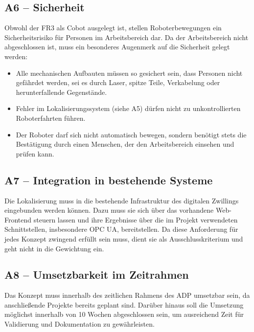 \subsection{A6 -- Sicherheit}
\label{subsec:Sicherheit}
Obwohl der FR3 als Cobot ausgelegt ist, stellen Roboterbewegungen ein Sicherheitsrisiko für Personen im Arbeitsbereich dar. Da der Arbeitsbereich nicht abgeschlossen ist, muss ein besonderes Augenmerk auf die Sicherheit gelegt werden:
\begin{itemize}
    \item Alle mechanischen Aufbauten müssen so gesichert sein, dass Personen nicht gefährdet werden, sei es durch Laser, spitze Teile, Verkabelung oder herunterfallende Gegenstände.
    \item Fehler im Lokalisierungssystem (siehe A5) dürfen nicht zu unkontrollierten Roboterfahrten führen.
    \item Der Roboter darf sich nicht automatisch bewegen, sondern benötigt stets die Bestätigung durch einen Menschen, der den Arbeitsbereich einsehen und prüfen kann.
\end{itemize}

\subsection{A7 -- Integration in bestehende Systeme}
\label{subsec:Integration}
Die Lokalisierung muss in die bestehende Infrastruktur des digitalen Zwillings eingebunden werden können. Dazu muss sie sich über das vorhandene Web-Frontend steuern lassen und ihre Ergebnisse über die im Projekt verwendeten Schnittstellen, insbesondere OPC UA, bereitstellen. Da diese Anforderung für jedes Konzept zwingend erfüllt sein muss, dient sie als Ausschlusskriterium und geht nicht in die Gewichtung ein.

\subsection{A8 -- Umsetzbarkeit im Zeitrahmen}
Das Konzept muss innerhalb des zeitlichen Rahmens des ADP umsetzbar sein, da anschließende Projekte bereits geplant sind. Darüber hinaus soll die Umsetzung möglichst innerhalb von 10 Wochen abgeschlossen sein, um ausreichend Zeit für Validierung und Dokumentation zu gewährleisten.

